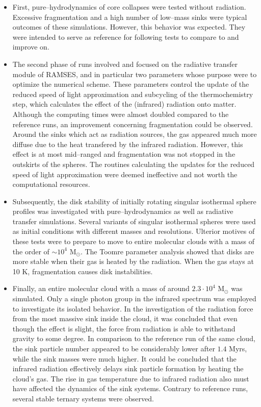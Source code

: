 \begin{itemize}
  \item First, pure--hydrodynamics of core collapses were tested without radiation.
        Excessive fragmentation and a high number of low--mass sinks were typical outcomes of these simulations.
        However, this behavior was expected.
        They were intended to serve as reference for following tests to compare to and improve on.
  \item The second phase of runs involved and focused on the radiative transfer module of RAMSES, and in particular two parameters whose purpose were to optimize the numerical scheme.
        These parameters control the update of the reduced speed of light approximation and subcycling of the thermochemistry step, which calculates the effect of the (infrared) radiation onto matter.
        Although the computing times were almost doubled compared to the reference runs, an improvement concerning fragmentation could be observed.
        Around the sinks which act as radiation sources, the gas appeared much more diffuse due to the heat transfered by the infrared radiation.
        However, this effect is at most mid--ranged and fragmentation was not stopped in the outskirts of the spheres.
        The routines calculating the updates for the reduced speed of light approximation were deemed ineffective and not worth the computational resources.
  \item Subsequently, the disk stability of initially rotating singular isothermal sphere profiles was investigated with pure--hydrodynamics as well as radiative transfer simulations.
        Several variants of singular isothermal spheres were used as initial conditions with different masses and resolutions.
        Ulterior motives of these tests were to prepare to move to entire molecular clouds with a mass of the order of $\sim10^{4}$ M$_{\odot}$.
        The Toomre parameter analysis showed that disks are more stable when their gas is heated by the radiation.
        When the gas stays at 10 K, fragmentation causes disk instabilities.
  \item Finally, an entire molecular cloud with a mass of around $2.3\cdot10^{4}$ M$_{\odot}$ was simulated.
        Only a single photon group in the infrared spectrum was employed to investigate its isolated behavior.
        In the investigation of the radiation force from the most massive sink inside the cloud, it was concluded that even though the effect is slight, the force from radiation is able to withstand gravity to some degree.
        In comparison to the reference run of the same cloud, the sink particle number appeared to be considerably lower after $1.4$ Myrs, while the sink masses were much higher.
        It could be concluded that the infrared radiation effectively delays sink particle formation by heating the cloud's gas.
        The rise in gas temperature due to infrared radiation also must have affected the dynamics of the sink systems.
        Contrary to reference runs, several stable ternary systems were observed.
\end{itemize}

